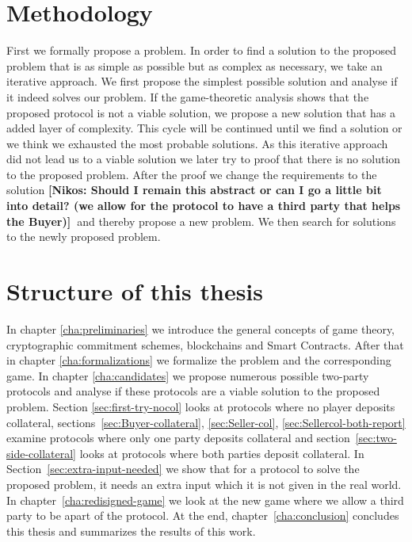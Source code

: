 \documentclass{cacthesis}
\newcommand{\authnote}[3]{{ \footnotesize \textbf{#1[#2: #3]~}}}
\newcommand{\niknote}[1]{\authnote{\color{red}}{Nikos}{#1}}
\begin{document}
	\section{Methodology}
	First we formally propose a problem. In order to find a solution to the proposed problem that is as simple as possible but as complex as necessary, we take an iterative approach.  We first propose the simplest possible solution and analyse if it indeed solves our problem. If the game-theoretic analysis shows that the proposed protocol is not a viable solution, we propose a new solution that has a added layer of complexity. This cycle will be continued until we find a solution or we think we exhausted the most probable solutions. As this iterative approach did not lead us to a viable solution we later try to proof that there is no solution to the proposed problem. After the proof we change the requirements to the solution \niknote{Should I remain this abstract or can I go a little bit into detail? (we allow for the protocol to have a third party that helps the Buyer)}and thereby propose a new problem. We then search for solutions to the newly proposed problem.

	\section{Structure of this thesis}
	In chapter \ref{cha:preliminaries} we introduce the general concepts of game theory, cryptographic commitment schemes, blockchains and Smart Contracts.  After that in chapter \ref{cha:formalizations} we formalize the problem and the corresponding game. %
	In chapter \ref{cha:candidates} we propose numerous possible two-party protocols and analyse if these protocols are a viable solution to the proposed problem. Section \ref{sec:first-try-nocol} looks at protocols where no player deposits collateral, sections~\ref{sec:Buyer-collateral}, \ref{sec:Seller-col}, \ref{sec:Sellercol-both-report} examine protocols where only one party deposits collateral and section~\ref{sec:two-side-collateral} looks at protocols where both parties deposit collateral. In Section~\ref{sec:extra-input-needed} we show that for a protocol to solve the proposed problem, it needs an extra input which it is not given in the real world. In chapter~\ref{cha:redisigned-game} we look at the new game where we allow a third party to be apart of the protocol. At the end, chapter~\ref{cha:conclusion} concludes this thesis and summarizes the results of this work.
\end{document}
